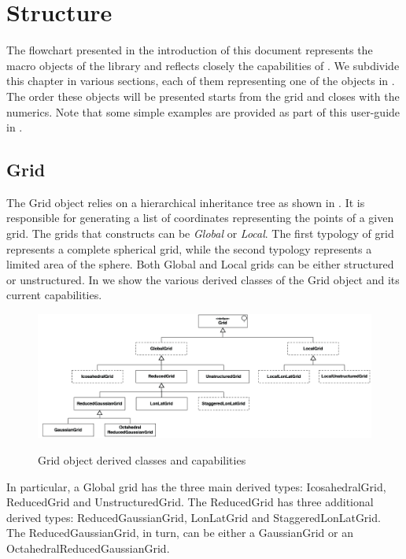 \chapter{Structure}
\label{chap:structure}
The flowchart presented in the introduction of this document 
represents the macro objects of the library and reflects 
closely the capabilities of \Atlas. We subdivide this 
chapter in various sections, each of them representing one 
of the objects in . The order these 
objects will be presented starts from the grid and closes 
with the numerics. Note that some simple examples are provided 
as part of this user-guide in .



\section{Grid}
The Grid object relies on a hierarchical inheritance tree 
as shown in . It is responsible for generating 
a list of coordinates representing the points of a given grid. 
The grids that \Atlas constructs can be \textit{Global} or 
\textit{Local}. The first typology of grid represents a complete 
spherical grid, while the second typology represents a limited 
area of the sphere. Both Global and Local grids can be either 
structured or unstructured. In  we show the 
various derived classes of the Grid object and its current 
capabilities.
%
\begin{figure}[htb]
\centering
\includegraphics[scale=0.3]{imgs/grids.png}
\label{fig:grids}
\caption{Grid object derived classes and capabilities}
\end{figure}
%
In particular, a Global grid has the three main derived 
types: IcosahedralGrid, ReducedGrid and UnstructuredGrid.
The ReducedGrid has three additional derived types: 
ReducedGaussianGrid, LonLatGrid and StaggeredLonLatGrid.
The ReducedGaussianGrid, in turn, can be either a GaussianGrid 
or an OctahedralReducedGaussianGrid.

